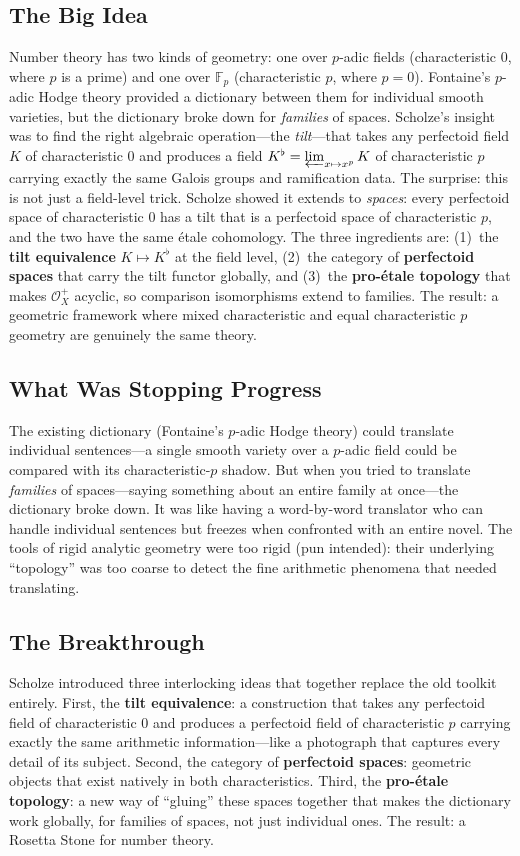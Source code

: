 \subsection{The Big Idea}
Number theory has two kinds of geometry: one over $p$-adic fields (characteristic 0, where $p$ is a prime) and one over $\mathbb{F}_p$ (characteristic $p$, where $p = 0$). Fontaine's $p$-adic Hodge theory provided a dictionary between them for individual smooth varieties, but the dictionary broke down for \emph{families} of spaces. Scholze's insight was to find the right algebraic operation---the \emph{tilt}---that takes any perfectoid field $K$ of characteristic 0 and produces a field $K^\flat = \varprojlim_{x \mapsto x^p} K$ of characteristic $p$ carrying exactly the same Galois groups and ramification data. The surprise: this is not just a field-level trick. Scholze showed it extends to \emph{spaces}: every perfectoid space of characteristic 0 has a tilt that is a perfectoid space of characteristic $p$, and the two have the same étale cohomology. The three ingredients are: (1)~the \textbf{tilt equivalence} $K \mapsto K^\flat$ at the field level, (2)~the category of \textbf{perfectoid spaces} that carry the tilt functor globally, and (3)~the \textbf{pro-étale topology} that makes $\mathcal{O}_X^+$ acyclic, so comparison isomorphisms extend to families. The result: a geometric framework where mixed characteristic and equal characteristic $p$ geometry are genuinely the same theory.

\subsection{What Was Stopping Progress}
The existing dictionary (Fontaine's $p$-adic Hodge theory) could translate individual sentences---a single smooth variety over a $p$-adic field could be compared with its characteristic-$p$ shadow. But when you tried to translate \emph{families} of spaces---saying something about an entire family at once---the dictionary broke down. It was like having a word-by-word translator who can handle individual sentences but freezes when confronted with an entire novel. The tools of rigid analytic geometry were too rigid (pun intended): their underlying ``topology'' was too coarse to detect the fine arithmetic phenomena that needed translating.

\subsection{The Breakthrough}
Scholze introduced three interlocking ideas that together replace the old toolkit entirely. First, the \textbf{tilt equivalence}: a construction that takes any perfectoid field of characteristic 0 and produces a perfectoid field of characteristic $p$ carrying exactly the same arithmetic information---like a photograph that captures every detail of its subject. Second, the category of \textbf{perfectoid spaces}: geometric objects that exist natively in both characteristics. Third, the \textbf{pro-étale topology}: a new way of ``gluing'' these spaces together that makes the dictionary work globally, for families of spaces, not just individual ones. The result: a Rosetta Stone for number theory.

